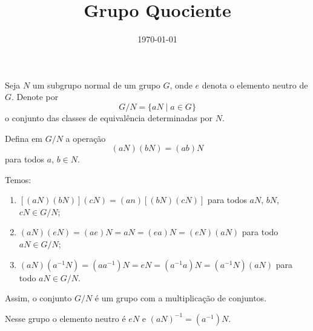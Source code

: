 \documentclass{beamer}
\title{Grupo Quociente}
\author[\autor]{\autor}
\institute[\instituto]{\instituto}
\date{\today}
\begin{document}
    \begin{frame}
        \maketitle
    \end{frame}


    \begin{frame}
        Seja $N$ um subgrupo normal de um grupo $G$, onde $e$ denota o elemento neutro de $G$. Denote por
        \[
            G/N = \{aN \mid a \in G\}
        \]
        o conjunto das classes de equivalência determinadas por $N$.
        
        \vspace{.3cm}

        Defina em $G/N$ a operação
        \[
            (aN)(bN) = (ab)N
        \]
        para todos $a$, $b \in N$.
    \end{frame}

    \begin{frame}
        Temos:

        \vspace{.3cm}
        
        \begin{enumerate}[label=({\roman*})]
            \item $[(aN)(bN)](cN) = (an)[(bN)(cN)]$ para todos $aN$, $bN$, $cN \in G/N$;

            \vspace{.3cm}
        
            \item $(aN)(eN) = (ae)N = aN = (ea)N = (eN)(aN)$ para todo $aN \in G/N$;

            \vspace{.3cm}
        

            \item $(aN)(a^{-1}N) = (aa^{-1})N = eN = (a^{-1}a)N = (a^{-1}N)(aN)$ para todo $aN \in G/N$.

            \vspace{.3cm}
        \end{enumerate}

        Assim, o conjunto $G/N$ é um grupo com a multiplicação de conjuntos.

        \vspace{.3cm}
        
        Nesse grupo o elemento neutro é $eN$ e $(aN)^{-1} = (a^{-1})N$.
    \end{frame}
\end{document}

